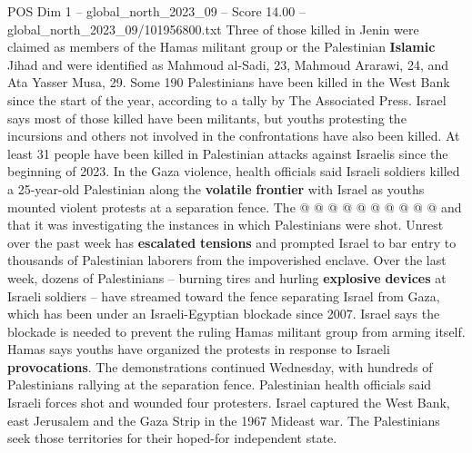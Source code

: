 \begin{textsample}{POS Dim 1 – global\_north\_2023\_09 – Score 14.00 – global\_north\_2023\_09/101956800.txt}
Three of those killed in Jenin were claimed as members of the Hamas militant group or the Palestinian \textbf{Islamic} Jihad and were identified as Mahmoud al-Sadi, 23, Mahmoud Ararawi, 24, and Ata Yasser Musa, 29.
Some 190 Palestinians have been killed in the West Bank since the start of the year, according to a tally by The Associated Press.
Israel says most of those killed have been militants, but youths protesting the incursions and others not involved in the confrontations have also been killed.
At least 31 people have been killed in Palestinian attacks against Israelis since the beginning of 2023.
In the Gaza violence, health officials said Israeli soldiers killed a 25-year-old Palestinian along the \textbf{volatile} \textbf{frontier} with Israel as youths mounted violent protests at a separation fence.
The @ @ @ @ @ @ @ @ @ @ and that it was investigating the instances in which Palestinians were shot.
Unrest over the past week has \textbf{escalated} \textbf{tensions} and prompted Israel to bar entry to thousands of Palestinian laborers from the impoverished enclave.
Over the last week, dozens of Palestinians -- burning tires and hurling \textbf{explosive} \textbf{devices} at Israeli soldiers -- have streamed toward the fence separating Israel from Gaza, which has been under an Israeli-Egyptian blockade since 2007.
Israel says the blockade is needed to prevent the ruling Hamas militant group from arming itself.
Hamas says youths have organized the protests in response to Israeli \textbf{provocations}.
The demonstrations continued Wednesday, with hundreds of Palestinians rallying at the separation fence.
Palestinian health officials said Israeli forces shot and wounded four protesters.
Israel captured the West Bank, east Jerusalem and the Gaza Strip in the 1967 Mideast war.
The Palestinians seek those territories for their hoped-for independent state.

\end{textsample}
